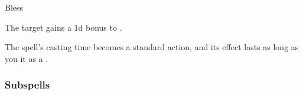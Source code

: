 \newpage
\begin{spellsection}{Bless}

\begin{spellheader}
\end{spellheader}

\begin{spellcontent}

\begin{spelltargetinginfo}



\end{spelltargetinginfo}


\begin{spelleffects}



\spelleffect
The target gains a \plus1d bonus to .








\end{spelleffects}

\end{spellcontent}
\begin{spellfooter}


\end{spellfooter}
\begin{spellsubcontent}


\begin{spellcantrip}
The spell's casting time becomes a standard action, and its effect lasts as long as you  it as a .
\end{spellcantrip}


\end{spellsubcontent}
\end{spellsection}


\subsubsection{Subspells}





